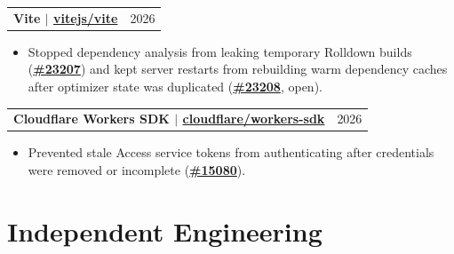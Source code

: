 \documentclass[letterpaper,11pt]{article}
\makeatletter
\newcommand{\resumeHeadingSimple}[2]{%
  \begin{tabularx}{\textwidth}{@{}Xr@{}}
    \textbf{#1} & #2
  \end{tabularx}\vspace{-1pt}
}
\newcommand{\resumeItemListStart}{\begin{itemize}[leftmargin=0.23in,itemsep=0.4pt,parsep=0pt,topsep=0.5pt]}
\newcommand{\resumeItem}[1]{\item\fontsize{9.9pt}{11.1pt}\selectfont #1}
\newcommand{\resumeItemListEnd}{\end{itemize}\vspace{-1.25pt}}
\makeatother
\begin{document}
\resumeHeadingSimple
  {Vite $|$ \href{https://redirect.github.com/vitejs/vite}{vitejs/vite}}
  {2026}
\resumeItemListStart
  \resumeItem{Stopped dependency analysis from leaking temporary Rolldown builds (\href{https://redirect.github.com/vitejs/vite/pull/23207}{\textbf{\#23207}}) and kept server restarts from rebuilding warm dependency caches after optimizer state was duplicated (\href{https://redirect.github.com/vitejs/vite/pull/23208}{\textbf{\#23208}}, open).}
\resumeItemListEnd

\resumeHeadingSimple
  {Cloudflare Workers SDK $|$ \href{https://redirect.github.com/cloudflare/workers-sdk}{cloudflare/workers-sdk}}
  {2026}
\resumeItemListStart
  \resumeItem{Prevented stale Access service tokens from authenticating after credentials were removed or incomplete (\href{https://redirect.github.com/cloudflare/workers-sdk/pull/15080}{\textbf{\#15080}}).}
\resumeItemListEnd

\section{Independent Engineering}
\end{document}
